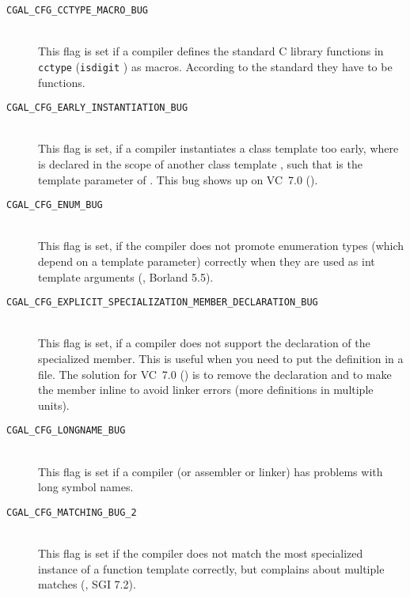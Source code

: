 \begin{description}
\item[{\tt CGAL\_CFG\_CCTYPE\_MACRO\_BUG}]~\\
 This flag is set if a compiler defines the standard C library
 functions in {\tt cctype} ({\tt isdigit} \etc) as macros.  According
 to the standard they have to be functions.
 
\item[{\tt CGAL\_CFG\_EARLY\_INSTANTIATION\_BUG}]~\\
  This flag is set, if a compiler instantiates a class template
   too early, where  is declared in the scope of
  another class template , such that  is the
  template parameter of . This bug shows up on VC~7.0
  ().

\item[{\tt CGAL\_CFG\_ENUM\_BUG}]~\\
 This flag is set, if the compiler does not promote enumeration types
 (which depend on a template parameter) correctly when they are used
 as int template arguments (\eg, Borland 5.5).

\item[{\tt CGAL\_CFG\_EXPLICIT\_SPECIALIZATION\_MEMBER\_DECLARATION\_BUG}]~\\
 This flag is set, if a compiler does not support the declaration of
 the specialized member. This is useful when you need to put the
 definition in a  file. The solution for VC~7.0 ()
 is to remove the declaration and to make the member inline to avoid
 linker errors (more definitions in multiple units).

\item[{\tt CGAL\_CFG\_LONGNAME\_BUG}]~\\
 This flag is set if a compiler (or assembler or linker) has problems 
 with long symbol names. 

\item[{\tt CGAL\_CFG\_MATCHING\_BUG\_2}]~\\
 This flag is set if the compiler does not match the most specialized
 instance of a function template correctly, but complains about
 multiple matches (\eg, SGI 7.2).


\end{description}
